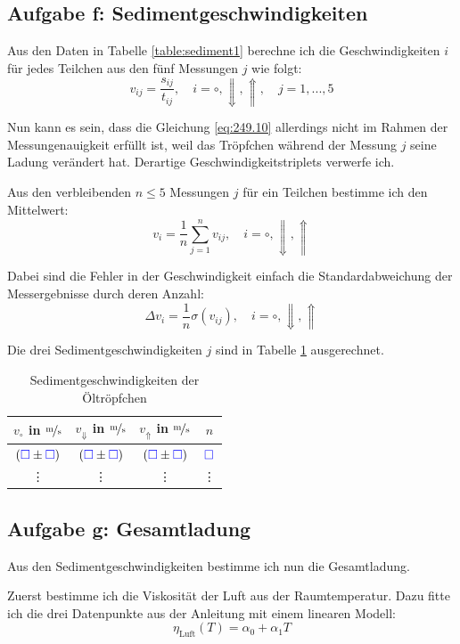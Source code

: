 \documentclass[11pt]{article}
\newcommand{\emesswert}{\left(\messwert \pm \messwert \right)}
\newcommand{\messwert}{\textcolor{blue}{\square}}
\begin{document}
\subsection{Aufgabe f: Sedimentgeschwindigkeiten}

\label{Auswertung-f}

Aus den Daten in Tabelle \ref{table:sediment1} berechne ich die
Geschwindigkeiten $i$ für jedes Teilchen aus den fünf Messungen $j$ wie folgt:
\[
	v_{ij} = \frac{s_{ij}}{t_{ij}}
	, \quad
	i = \circ, \Downarrow, \Uparrow
	, \quad
	j = 1, ..., 5
\]

Nun kann es sein, dass die Gleichung \eqref{eq:249.10} allerdings nicht im
Rahmen der Messungenauigkeit erfüllt ist, weil das Tröpfchen während der
Messung $j$ seine Ladung verändert hat. Derartige Geschwindigkeitstriplets
verwerfe ich.

Aus den verbleibenden $n \leq 5$ Messungen $j$ für ein Teilchen bestimme ich
den Mittelwert:
\[
	v_i = \frac 1n \sum_{j=1}^n v_{ij}
	, \quad
	i = \circ, \Downarrow, \Uparrow
\]

Dabei sind die Fehler in der Geschwindigkeit einfach die Standardabweichung der
Messergebnisse durch deren Anzahl:
\[
	\Delta v_i = \frac 1n \sigma \left( v_{ij} \right)
	, \quad
	i = \circ, \Downarrow, \Uparrow
\]

Die drei Sedimentgeschwindigkeiten $j$ sind in Tabelle \ref{table:sediment2}
ausgerechnet.

\begin{table}[h!]
	\centering

	\begin{tabular}{cccc}
		$v_\circ$ in $\unitfrac ms$ & $v_\Downarrow$ in $\unitfrac ms$ & $v_\Uparrow$ in $\unitfrac ms$ & $n$ \\
		\hline
		$\emesswert$ & $\emesswert$ & $\emesswert$ & $\messwert$ \\
					\vdots & \vdots & \vdots & \vdots
	\end{tabular}

	\caption{Sedimentgeschwindigkeiten der Öltröpfchen}
	\label{table:sediment2}
\end{table}

\subsection{Aufgabe g: Gesamtladung}

Aus den Sedimentgeschwindigkeiten bestimme ich nun die Gesamtladung.

Zuerst bestimme ich die Viskosität der Luft aus der Raumtemperatur. Dazu fitte
ich die drei Datenpunkte aus der Anleitung mit einem linearen Modell:
\[ \eta_\text{Luft}(T) = \alpha_0 + \alpha_1 T \]
\end{document}
